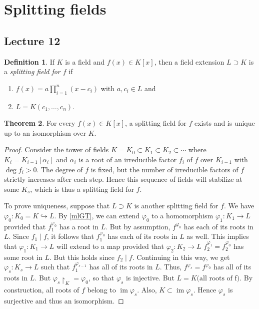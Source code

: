 \documentclass[10pt,letterpaper,cm]{nupset}
\theoremstyle{definition}
\newtheorem{definition}{Definition}[subsection]
\theoremstyle{theorem}
\newtheorem{theorem}[definition]{Theorem}
\theoremstyle{remark}
\newcommand{\1}{\mathbf{1}}
\newcommand{\0}{\vec 0}
\DeclareMathOperator{\im}{im}
\begin{document}
\section{Splitting fields}

\subsection{Lecture 12}

\begin{definition}
If $K$ is a field and $f(x) \in K[x]$, then a field extension $L \supset K$ is a \textit{splitting field for $f$} if
\begin{enumerate}[label=(\alph*)]
\item $f(x) = a \prod_{i=1}^n (x-c_i)$ with $a, c_i \in L$ and
\item $L = K(c_1, \ldots, c_n)$.
\end{enumerate}
\end{definition}

\begin{theorem}
 For every $f(x) \in K[x]$, a splitting field for $f$ exists and is unique up to an isomorphism over $K$.
\end{theorem}
\begin{proof}
Consider the tower of fields $K= K_0 \subset K_1 \subset K_2 \subset \cdots$ where $K_i = K_{i-1}[\alpha_i]$ and $\alpha_i$ is a root of an irreducible factor $f_i$ of $f$ over $K_{i-1}$ with $\deg{f_i}>0$. The degree of $f$ is fixed, but the number of irreducible factors of $f$ strictly increases after each step. Hence this sequence of fields will stabilize at some $K_s$, which is thus a splitting field for $f$. 

\medskip

 To prove uniqueness, suppose that $L \supset K$ is another splitting field for $f$. We have $\varphi_0 : K_0 = K \hookrightarrow L$. By \cref{mlGT}, we can extend $\varphi_0 $ to a homomorphism $\varphi_1 : K_1 \to L$ provided that $f_1^{\varphi_0}$ has a root in $L$. But by assumption, $f^{\varphi_0}$ has each of its roots in $L$. Since $f_1 \mid f$, it follows that $f_1^{\varphi_0}$ has each of its roots in $L$ as well. This implies that $\varphi_1 : K_1 \to L$ will extend to a map provided that $\varphi_2 : K_2 \to L$ $f_2^{\varphi_1} = f_2^{\varphi_0}$ has some root in $L$.  But this holds since $f_2 \mid f$. Continuing in this way, we get $\varphi_s : K_s \to L$ such that $f_1^{\varphi_{s-1}}$ has all of its roots in $L$. Thus, $f^{\varphi_s} = f^{\varphi_0}$ has all of its roots in $L$. But $\varphi_s \restriction_K = \varphi_0$, so that $\varphi_s$ is injective. But $L = K(\text{all roots of } $f$)$. By construction, all roots of $f$ belong to $\im{\varphi_s}$. Also, $K \subset \im{\varphi_s}$. Hence $\varphi_s$ is surjective and thus an isomorphism.
\end{proof}
\end{document}
